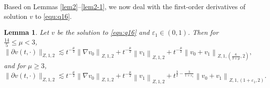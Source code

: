 \documentclass[11pt,twoside]{article}
\newcommand{\p}{\partial}
\newcommand{\f}{\frac}
\theoremstyle{plain}
\newtheorem{lemma}[theorem]{Lemma}
\theoremstyle{definition}
\theoremstyle{remark}
\numberwithin{equation}{section}
\begin{document}
Based on  Lemmas \ref{lem2}--\ref{lem2-1},  we now deal with the first-order derivatives of solution $v$
to \eqref{equ:q16}.
\begin{lemma}\label{lem3}
Let $v$ be the solution to \eqref{equ:q16} and $\varepsilon_1\in(0, 1)$. Then for $\f{14}{5}\leq\mu<3$,
\begin{equation}\label{e:q71'}
\|\p v(t, \cdot)\|_{Z, 1, 2} \lesssim t^{-\f{\mu}{2}}\left\|\nabla v_0\right\|_{Z, 1, 2}+t^{-\f{\mu}{2}}\left\| v_1\right\|_{Z, 1, 2}+t^{-\f{\mu}{2}}\left\|v_0+v_1\right\|_{Z, 1,(\f{6}{3+\mu},2)},
\end{equation}
and for $\mu\geq3$,
\begin{equation}\label{e:q71}
\|\p v(t, \cdot)\|_{Z, 1, 2} \lesssim t^{-\f{\mu}{2}}\left\|\nabla v_0\right\|_{Z, 1, 2}+t^{-\f{\mu}{2}}\left\| v_1\right\|_{Z, 1, 2}+t^{\f32-\f{3}{1+\varepsilon_1}}\left\|v_0+v_1\right\|_{Z, 1,(1+\varepsilon_1,2)}.
\end{equation}
\end{lemma}
\end{document}
